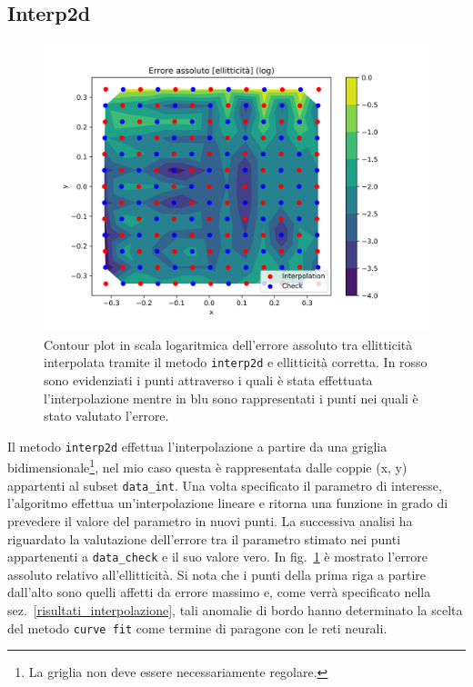 \documentclass[12pt,a4paper,final]{book}
\begin{document}
\subsection{Interp2d}\label{interp2d}
\begin{figure}[t]
	\centering
	\includegraphics[scale=0.8]{../figures/errore_assoluto_ell.png}
	\caption{Contour plot in scala logaritmica dell'errore assoluto tra ellitticità interpolata tramite il metodo \texttt{interp2d} e ellitticità corretta. In rosso sono evidenziati i punti attraverso i quali è stata effettuata l'interpolazione mentre in blu sono rappresentati i punti nei quali è stato valutato l'errore.}
	\label{err_interp2d}
\end{figure}
Il metodo \texttt{interp2d} effettua l'interpolazione a partire da una griglia bidimensionale\footnote{La griglia non deve essere necessariamente regolare.}, nel mio caso questa è rappresentata dalle coppie (x, y) appartenti al subset \texttt{data\_int}. Una volta specificato il parametro di interesse, l'algoritmo effettua un'interpolazione lineare e ritorna una funzione in grado di prevedere il valore del parametro in nuovi punti.
La successiva analisi ha riguardato la valutazione dell'errore tra il parametro stimato nei punti appartenenti a \texttt{data\_check} e il suo valore vero. In fig.~\ref{err_interp2d} è mostrato l'errore assoluto relativo all'ellitticità.
Si nota che i punti della prima riga a partire dall'alto sono quelli affetti da errore massimo e, come verrà specificato nella sez.~\ref{risultati_interpolazione}, tali anomalie di bordo hanno determinato la scelta del metodo \texttt{curve fit} come termine di paragone con le reti neurali.
\end{document}
